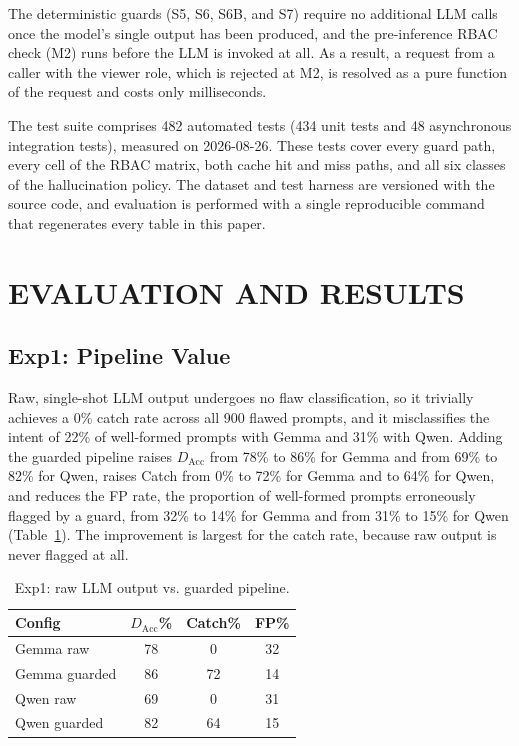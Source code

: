 \documentclass[a4paper,twoside]{article}
\begin{document}
The deterministic guards (S5, S6, S6B, and S7) require no additional LLM calls once the model's single output has been produced, and the pre-inference RBAC check (M2) runs before the LLM is invoked at all. As a result, a request from a caller with the viewer role, which is rejected at M2, is resolved as a pure function of the request and costs only milliseconds.

The test suite comprises 482 automated tests (434 unit tests and 48 asynchronous integration tests), measured on 2026-08-26. These tests cover every guard path, every cell of the RBAC matrix, both cache hit and miss paths, and all six classes of the hallucination policy. The dataset and test harness are versioned with the source code, and evaluation is performed with a single reproducible command that regenerates every table in this paper.


\section{\uppercase{Evaluation and Results}}
\label{sec:results}

\subsection{Exp1: Pipeline Value}

\noindent Raw, single-shot LLM output undergoes no flaw classification, so it trivially achieves a 0\% catch rate across all 900 flawed prompts, and it misclassifies the intent of 22\% of well-formed prompts with Gemma and 31\% with Qwen. Adding the guarded pipeline raises $D_{\mathrm{Acc}}$ from 78\% to 86\% for Gemma and from 69\% to 82\% for Qwen, raises Catch from 0\% to 72\% for Gemma and to 64\% for Qwen, and reduces the FP rate, the proportion of well-formed prompts erroneously flagged by a guard, from 32\% to 14\% for Gemma and from 31\% to 15\% for Qwen (Table~\ref{tab:exp1}). The improvement is largest for the catch rate, because raw output is never flagged at all.

\begin{table}[h]
\caption{Exp1: raw LLM output vs. guarded pipeline.}\label{tab:exp1}
\centering
\small
\begin{tabular}{|l|c|c|c|}
  \hline
  Config & $D_{\mathrm{Acc}}$\% & Catch\% & FP\% \\
  \hline
  Gemma raw & 78 & 0 & 32 \\
  Gemma guarded & 86 & 72 & 14 \\
  Qwen raw & 69 & 0 & 31 \\
  Qwen guarded & 82 & 64 & 15 \\
  \hline
\end{tabular}
\end{table}
\end{document}
